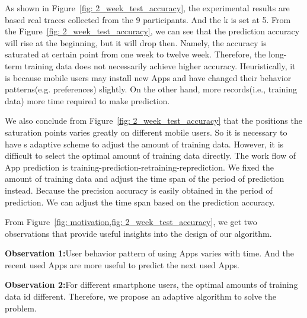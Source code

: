 As shown in Figure~\ref{fig: 2_week_test_accuracy}, the experimental results are based real traces collected from the 9 participants. And the k is set at 5. From the Figure~\ref{fig: 2_week_test_accuracy}, we can see that the prediction accuracy will rise at the beginning, but it will drop then. Namely, the accuracy is saturated at certain point from one week to twelve week. Therefore, the long-term training data does not necessarily achieve higher accuracy. Heuristically, it is because mobile users may install new Apps and have changed their behavior patterns(e.g. preferences) slightly. On the other hand, more records(i.e., training data) more time required to make prediction.


We also conclude from Figure~\ref{fig: 2_week_test_accuracy} that the positions the saturation points varies greatly on different mobile users. So it is necessary to have s adaptive scheme to adjust the amount of training data. However, it is difficult to select the optimal amount of training data directly. The work flow of App prediction is training-prediction-retraining-reprediction. We fixed the amount of training data and adjust the time span of the period of prediction instead. Because the precision accuracy is easily obtained in the period of prediction. We can adjust the time span based on the prediction accuracy.


From Figure~\ref{fig: motivation,fig: 2_week_test_accuracy}, we get two observations that provide useful insights into the design of our algorithm.


\textbf{Observation 1:}User behavior pattern of using Apps varies with time. And the recent used Apps are more useful to predict the next used Apps.


\textbf{Observation 2:}For different smartphone users, the optimal amounts of training data id different. Therefore, we propose an adaptive algorithm to solve the problem.





